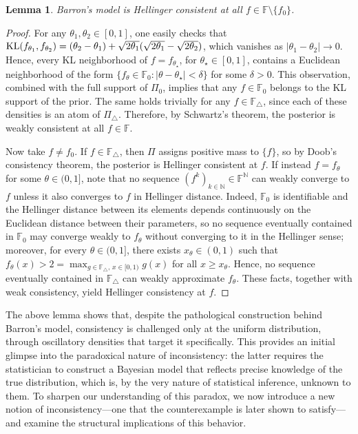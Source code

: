 \documentclass[11pt,twoside]{article}
\newcommand{\kl}{\textnormal{KL}}
\newtheorem{lemma}{Lemma}
\def\NN{\mathbb{N}}
\def\FF{\mathbb{F}}
\def\FF{\mathbb{F}}
\begin{document}
\begin{lemma}
    Barron's model is Hellinger consistent at all $f\in\mathbb F\setminus\{f_0\}$.
\end{lemma}
\begin{proof}
    For any $\theta_1, \theta_2 \in [0,1]$, one easily checks that $\kl(f_{\theta_1}, f_{\theta_2}) = (\theta_2 - \theta_1) + \sqrt{2\theta_1}(\sqrt{2\theta_1} - \sqrt{2\theta_2})$, which vanishes as $\lvert \theta_1 - \theta_2 \rvert \to 0$. Hence, every KL neighborhood of $f = f_{\theta_\star}$, for $\theta_\star \in [0,1]$, contains a Euclidean neighborhood of the form $\{f_\theta \in \FF_0 : \lvert \theta - \theta_\star \rvert < \delta\}$ for some $\delta>0$. This observation, combined with the full support of $\Pi_0$, implies that any $f \in \FF_0$ belongs to the KL support of the prior. The same holds trivially for any $f \in \FF_\triangle$, since each of these densities is an atom of $\Pi_\triangle$. Therefore, by Schwartz's theorem, the posterior is weakly consistent at all $f \in \FF$.

    Now take $f \neq f_0$. If $f \in \FF_\triangle$, then $\Pi$ assigns positive mass to $\{f\}$, so by Doob's consistency theorem, the posterior is Hellinger consistent at $f$. If instead $f = f_\theta$ for some $\theta \in (0,1]$, note that no sequence $(f^k)_{k \in \NN} \in \FF^\NN$ can weakly converge to $f$ unless it also converges to $f$ in Hellinger distance. Indeed, $\FF_0$ is identifiable and the Hellinger distance between its elements depends continuously on the Euclidean distance between their parameters, so no sequence eventually contained in $\FF_0$ may converge weakly to $f_\theta$ without converging to it in the Hellinger sense; moreover, for every $\theta \in (0,1]$, there exists $x_\theta \in (0,1)$ such that $f_\theta(x) > 2 = \max_{g \in \FF_\triangle,\, x \in [0,1)} g(x)$ for all $x \ge x_\theta$. Hence, no sequence eventually contained in $\FF_\triangle$ can weakly approximate $f_\theta$. These facts, together with weak consistency, yield Hellinger consistency at $f$.
\end{proof}


The above lemma shows that, despite the pathological construction behind Barron’s model, consistency is challenged only at the uniform distribution, through oscillatory densities that target it specifically. This provides an initial glimpse into the paradoxical nature of inconsistency: the latter requires the statistician to construct a Bayesian model that reflects precise knowledge of the true distribution, which is, by the very nature of statistical inference, unknown to them. To sharpen our understanding of this paradox, we now introduce a new notion of inconsistency—one that the counterexample is later shown to satisfy—and examine the structural implications of this behavior.
\end{document}
